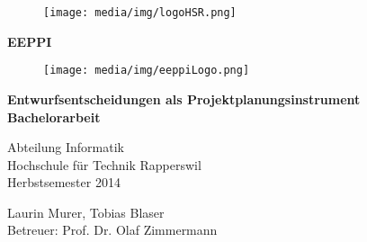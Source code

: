 \documentclass[ngerman,a4paper,12pt]{scrreprt}
\author{Laurin Murer, Tobias Blaser}
\title{\documentType \project}
\date{\today{}, Rapperswil}
\providecommand{\project}{Entwurfsentscheidungen als Projektplanungsinstrument}
\providecommand{\teacher}{Prof. Dr. Olaf Zimmermann}
\begin{document}
\thispagestyle{empty}
\begin{titlepage}
	\begin{figure}[htp]
		\texttt{[image: media/img/logoHSR.png]}
	\end{figure}	
	
	\begin{center}

		\vspace*{0.5cm}
		{\fontsize{50}{40} \selectfont \textbf{EEPPI} \\[10mm]}
	
		\begin{figure}[htp]
			\centering
			\texttt{[image: media/img/eeppiLogo.png]}
		\end{figure}		
		\vspace*{1cm}	
	
		{\fontsize{28}{40} \selectfont \textbf{\project} \\[10mm]}
		{\fontsize{22}{40} \selectfont \textbf{Bachelorarbeit} \\[10mm]}
	
		{\fontsize{18}{20} \selectfont 
			Abteilung Informatik\\
			Hochschule für Technik Rapperswil \\
				
			\vspace*{1cm}
			Herbstsemester 2014\\
		}
		
		\vspace*{2cm}
		Laurin Murer, Tobias Blaser \\
		Betreuer: \teacher

	\end{center}
\end{titlepage}
\clearpage



%


\tableofcontents



%
%






\end{document}

